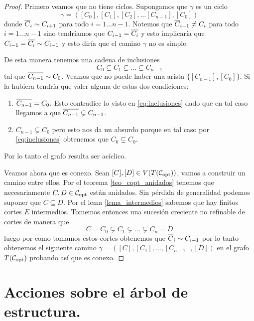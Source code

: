 \documentclass[tesis.tex]{subfiles}
\begin{document}
\begin{proof}
	Primero veamos que no tiene ciclos.
	Supongamos que $\gamma$	es un ciclo
	\[
		\gamma = ([C_0], [C_1], [C_2], \dots [C_{n-1}], [C_0])
	\]
	donde $\overline C_{i} \sim C_{i+1}$ para todo $i=1 \dots n-1$.
	Notemos que $\overline C_{i-1} \neq C_{i}$ para todo $i=1 \dots n-1$ sino tendríamos que $C_{i-1} = \overline{ C_{i}}$ y esto implicaría que $C_{i-1} = \overline{C_{i}} \sim C_{i-1}$
	y esto diría que el camino $\gamma$ no es simple.
	
	De esta manera tenemos una cadena de inclusiones
	\begin{equation}\label{eq:inclusiones}
			C_0 \subsetneq C_1 \subsetneq \dots  \subsetneq C_{n-1}
	\end{equation}
	tal que $\overline{ C_{n-1}} \sim C_0$.
	Veamos que no puede haber una arista $\{[{ C_{n-1}}], [C_0]\}$.
	Si la hubiera tendría que valer alguna de estas dos condiciones:
	\begin{enumerate}
		\item $\overline{C_{n-1}} = C_{0}$. 
		Esto contradice lo visto en \ref{eq:inclusiones} dado que en tal caso
		 llegamos a que $\overline{C_{n-1}} \subsetneq C_{n-1}$.
		
		\item ${C_{n-1}} \subsetneq C_{0}$ pero esto nos da un absurdo porque en tal caso por \ref{eq:inclusiones} obtenemos que $C_{0} \subsetneq C_{0}$.
	\end{enumerate}
	Por lo tanto el grafo resulta ser acíclico.
	
	Veamos ahora que es conexo.
	Sean $[C], [D] \in V(T({\cal C}_{\text{opt}}))$, vamos a construir un camino entre ellos.
	Por el teorema \ref{teo_copt_anidados} tenemos que necesariamente $C,D \in {\cal C}_{\text{opt}}$ están anidados.
	Sin pérdida de generalidad podemos suponer que $C \subseteq D$.
	Por el lema \ref{lema_intermedios} sabemos que hay finitos cortes $E$ intermedios.
	Tomemos entonces una sucesión creciente no refinable de cortes de manera que  
	\[
		C=C_0 \subsetneq C_1 \subsetneq \dots \subsetneq C_n = D
	\]
	luego por como tomamos estos cortes obtenemos que $\overline C_i \sim C_{i+1}$ por lo tanto obtenemos el siguiente camino $\gamma = ([C],[C_1], \dots, [C_{n-1}],[D])$ en el grafo $T({\cal C}_{\text{opt}})$ probando así que es conexo.	
\end{proof}





\section{Acciones sobre el árbol de estructura.}\label{secc_accion_arbol_estr}
\end{document}

